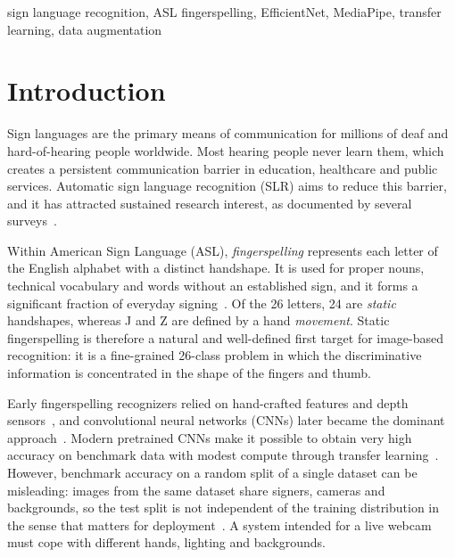 \documentclass[conference]{IEEEtran}
\begin{document}
\begin{IEEEkeywords}
sign language recognition, ASL fingerspelling, EfficientNet, MediaPipe, transfer learning, data augmentation
\end{IEEEkeywords}

\section{Introduction}
Sign languages are the primary means of communication for millions of deaf and hard-of-hearing people worldwide. Most hearing people never learn them, which creates a persistent communication barrier in education, healthcare and public services. Automatic sign language recognition (SLR) aims to reduce this barrier, and it has attracted sustained research interest, as documented by several surveys~\cite{rastgoo2021survey,cheok2019review,koller2020quantitative}.

Within American Sign Language (ASL), \emph{fingerspelling} represents each letter of the English alphabet with a distinct handshape. It is used for proper nouns, technical vocabulary and words without an established sign, and it forms a significant fraction of everyday signing~\cite{shi2018fingerspelling}. Of the 26 letters, 24 are \emph{static} handshapes, whereas J and Z are defined by a hand \emph{movement}. Static fingerspelling is therefore a natural and well-defined first target for image-based recognition: it is a fine-grained 26-class problem in which the discriminative information is concentrated in the shape of the fingers and thumb.

Early fingerspelling recognizers relied on hand-crafted features and depth sensors~\cite{pugeault2011spelling,kang2015realtime}, and convolutional neural networks (CNNs) later became the dominant approach~\cite{pigou2014sign}. Modern pretrained CNNs make it possible to obtain very high accuracy on benchmark data with modest compute through transfer learning~\cite{yosinski2014transferable,pan2010survey}. However, benchmark accuracy on a random split of a single dataset can be misleading: images from the same dataset share signers, cameras and backgrounds, so the test split is not independent of the training distribution in the sense that matters for deployment~\cite{torralba2011unbiased}. A system intended for a live webcam must cope with different hands, lighting and backgrounds.
\end{document}
